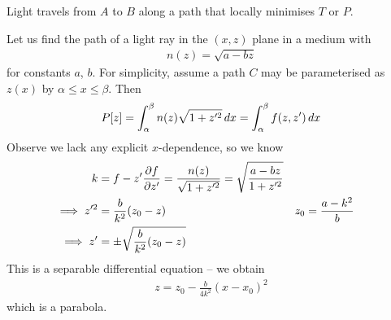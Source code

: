 \documentclass{../template/note}
\begin{document}
    \begin{proposition}
        Light travels from $A$ to $B$ along a path that locally minimises $T$ or $P$.
    \end{proposition}
    
    \begin{example*}
        Let us find the path of a light ray in the $(x, z)$ plane in a medium with
        \begin{align*}
            n(z) = \sqrt{a-bz}
        \end{align*}
        for constants $a$, $b$. For simplicity, assume a path $C$ may be parameterised as $z(x)$ by $\alpha \leq x \leq \beta$. Then
        \begin{align*}
            P[z] = \int_\alpha^\beta n(z) \sqrt{1+z'^2} \,d{x} = \int_\alpha^\beta f(z, z') \,d{x}
        \end{align*}
        Observe we lack any explicit $x$-dependence, so we know
        \begin{align*}
            k &= f - z' \pd{f}{z'} = \frac{n(z)}{\sqrt{1+z'^2}} = \sqrt{\frac{a-bz}{1+z'^2}} \\
            \implies z'^2 &= \frac{b}{k^2}(z_0-z) && z_0 = \frac{a-k^2}{b} \\
            \implies z' &= \pm \sqrt{\frac{b}{k^2}(z_0-z)} 
        \end{align*}
        This is a separable differential equation -- we obtain
        \begin{align*}
            z = z_0 - \frac{b}{4k^2}(x-x_0)^2
        \end{align*}
        which is a parabola.      
    \end{example*}
    
\end{document}
